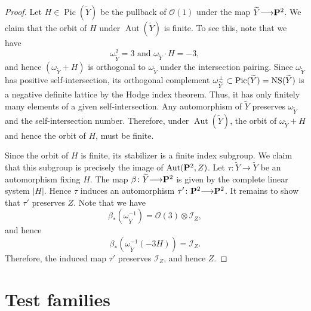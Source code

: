\documentclass[reqno]{amsart}
\renewcommand{\to}{{\longrightarrow}}
\renewcommand {\P}{{\bf P}}
\providecommand{\Aut}{\operatorname{Aut}}
\providecommand{\Pic}{\operatorname{Pic}}
\numberwithin{equation}{section}
\renewcommand{\O}{\mathcal{O}}
\begin{document}
\begin{proof}
  Let $H \in \Pic(\widetilde Y)$ be the pullback of $\O(1)$ under the map $\widetilde Y \to \P^2$.
  We claim that the orbit of $H$ under $\Aut(\widetilde Y)$ is finite.
  To see this, note that we have
  \[ \omega_{\widetilde Y}^2 = 3 \text{ and } \omega_{\widetilde Y} \cdot H = -3, \]
  and hence $(\omega_{\widetilde Y} + H)$ is orthogonal to $\omega_{\widetilde Y}$ under the intersection pairing.
  Since $\omega_{\widetilde Y}$ has positive self-intersection, its orthogonal complement $\omega_{\widetilde Y}^{\perp} \subset \Pic(\widetilde Y) = {\rm NS}(\widetilde Y)$ is a negative definite lattice by the Hodge index theorem.
  Thus, it has only finitely many elements of a given self-intersection.
  Any automorphism of $\widetilde Y$ preserves $\omega_{\widetilde Y}$ and the self-intersection number.
  Therefore, under $\Aut(\widetilde Y)$, the orbit of $\omega_{\widetilde Y} + H$ and hence the orbit of $H$, must be finite.

  Since the orbit of $H$ is finite, its stabilizer is a finite index subgroup.
  We claim that this subgroup is precisely the image of $\Aut(\P^2, Z)$.
  Let $\tau \colon \widetilde Y \to \widetilde Y$ be an automorphism fixing $H$.
  The map $\beta \colon \widetilde Y \to \P^2$ is given by the complete linear system $|H|$.
  Hence $\tau$ induces an automorphism $\tau' \colon \P^2 \to \P^2$.
  It remains to show that $\tau'$ preserves $Z$.
  Note that we have
  \[ \beta_* \left(\omega_{\widetilde Y}^{-1}\right) = \O(3) \otimes \mathcal{I}_Z,\]
  and hence
  \[ \beta_* \left( \omega_{\widetilde Y}^{-1} (-3H) \right) = \mathcal{I}_Z.\]
  Therefore, the induced map $\tau'$ preserves $\mathcal{I}_Z$, and hence $Z$.
\end{proof}



\section{Test families}\label{sec:testfamilies}
\end{document}
